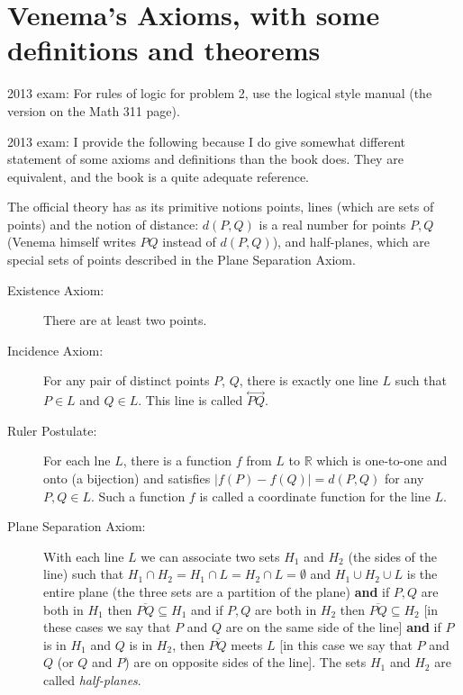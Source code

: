 \documentclass[12pt]{article}
\newcommand\Line[1]{\overset{\leftrightarrow}{#1}}
\begin{document}
\section{Venema's Axioms, with some definitions and theorems}

2013 exam:  For rules of logic for problem 2, use the logical style manual (the version on the Math 311 page).

2013 exam:   I provide the following because I do give somewhat different statement of some axioms and definitions than the book does.  They are equivalent, and the book is a quite adequate reference. 

The official theory has as its primitive notions points, lines (which are sets of points) and the notion of distance:  $d(P,Q)$ is a real number for points $P,Q$ (Venema himself writes
$PQ$ instead of $d(P,Q)$), and half-planes, which are special sets of points described in the Plane Separation Axiom.

\begin{description}
\item[Existence Axiom:]  There are at least two points.

\item[Incidence Axiom:]  For any pair of distinct points $P$, $Q$, there is exactly one line $L$ such that $P \in L$ and $Q \in L$.  This line is called $\Line{PQ}$.

\item[Ruler Postulate:]  For each lne $L$, there is a function $f$ from $L$ to $\mathbb R$ which is one-to-one and onto (a bijection) and satisfies $|f(P)-f(Q)| = d(P,Q)$ for any $P,Q \in L$.
Such a function $f$ is called a coordinate function for the line $L$.

\item[Plane Separation Axiom:]  With each line $L$ we can associate two sets $H_1$ and $H_2$ (the sides of the line) such that $H_1 \cap H_2 = H_1 \cap L = H_2 \cap L = \emptyset$
and $H_1 \cup H_2 \cup L$ is the entire plane (the three sets are a partition of the plane) {\bf and} if $P,Q$ are both in $H_1$ then $\overline{PQ} \subseteq H_1$ and if $P,Q$ are both in $H_2$ then $\overline{PQ} \subseteq H_2$ [in these cases we say that $P$ and $Q$ are on the same side of the line] {\bf and} if $P$ is in $H_1$ and $Q$ is in $H_2$, then $\overline{PQ}$ meets $L$ [in this case we say that $P$ and $Q$ (or $Q$ and $P$) are on opposite sides of the line].  The sets $H_1$ and $H_2$ are called {\em half-planes\/}.


\end{description}
\end{document}
